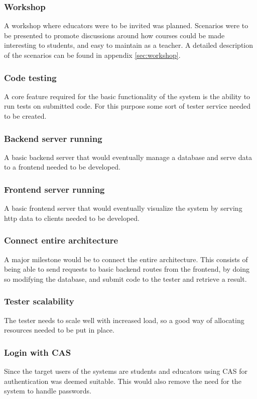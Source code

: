 \subsubsection{Workshop}
A workshop where educators were to be invited was planned. Scenarios were to be presented to promote discussions around how courses could be made interesting to students, and easy to maintain as a teacher. A detailed description of the scenarios can be found in appendix \ref{sec:workshop}.

\subsubsection{Code testing}
A core feature required for the basic functionality of the system is the ability to run tests on submitted code. For this purpose some sort of tester service needed to be created.

\subsubsection{Backend server running}
A basic backend server that would eventually manage a database and serve data to a frontend needed to be developed.

\subsubsection{Frontend server running}
A basic frontend server that would eventually visualize the system by serving http data to clients needed to be developed.

\subsubsection{Connect entire architecture}
A major milestone would be to connect the entire architecture. This consists of being able to send requests to basic backend routes from the frontend, by doing so modifying the database, and submit code to the tester and retrieve a result.

\subsubsection{Tester scalability}
The tester needs to scale well with increased load, so a good way of allocating resources needed to be put in place.

\subsubsection{Login with CAS}
Since the target users of the systems are students and educators using CAS for authentication was deemed suitable. This would also remove the need for the system to handle passwords.

